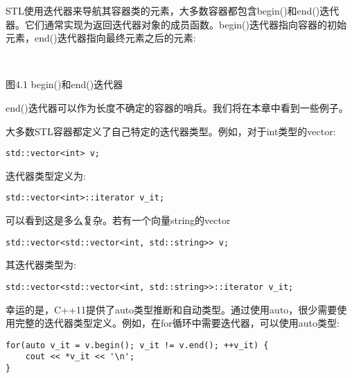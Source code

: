 

STL使用迭代器来导航其容器类的元素，大多数容器都包含begin()和end()迭代器。它们通常实现为返回迭代器对象的成员函数。begin()迭代器指向容器的初始元素，end()迭代器指向最终元素之后的元素:

\hspace*{\fill} \\ %
\begin{center}

图4.1  begin()和end()迭代器
\end{center}

end()迭代器可以作为长度不确定的容器的哨兵。我们将在本章中看到一些例子。

大多数STL容器都定义了自己特定的迭代器类型。例如，对于int类型的vector:

\begin{lstlisting}[style=styleCXX]
std::vector<int> v;
\end{lstlisting}

迭代器类型定义为:

\begin{lstlisting}[style=styleCXX]
std::vector<int>::iterator v_it;
\end{lstlisting}

可以看到这是多么复杂。若有一个向量string的vector

\begin{lstlisting}[style=styleCXX]
std::vector<std::vector<int, std::string>> v;
\end{lstlisting}

其迭代器类型为:

\begin{lstlisting}[style=styleCXX]
std::vector<std::vector<int, std::string>>::iterator v_it;
\end{lstlisting}

幸运的是，C++11提供了auto类型推断和自动类型。通过使用auto，很少需要使用完整的迭代器类型定义。例如，在for循环中需要迭代器，可以使用auto类型:

\begin{lstlisting}[style=styleCXX]
for(auto v_it = v.begin(); v_it != v.end(); ++v_it) {
	cout << *v_it << '\n';
}
\end{lstlisting}


